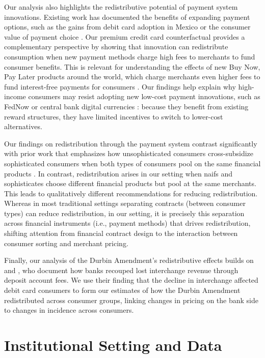 \documentclass[11pt,english]{article}
\theoremstyle{remark}
\begin{document}
Our analysis also highlights the redistributive potential of payment system innovations.
Existing work has documented the benefits of expanding payment options, such as the gains from debit card adoption in Mexico \citep{Higgins2024} or the consumer value of payment choice \citep{Alvarez.Argente2025}.
Our premium credit card counterfactual provides a complementary perspective by showing that innovation can redistribute consumption when new payment methods charge high fees to merchants to fund consumer benefits.
This is relevant for understanding the effects of new Buy Now, Pay Later products around the world, which charge merchants even higher fees to fund interest-free payments for consumers \citep{Berg.etal2024}.
Our findings help explain why high-income consumers may resist adopting new low-cost payment innovations, such as FedNow or central bank digital currencies \citep{whited2022will}: because they benefit from existing reward structures, they have limited incentives to switch to lower-cost alternatives.

Our findings on redistribution through the payment system contrast significantly with prior work that emphasizes how unsophisticated consumers cross-subsidize sophisticated consumers when both types of consumers pool on the same financial products \citep{Gabaix.Laibson2006, Fisher.etal2024, Agarwal.etal2022}.
In contrast, redistribution arises in our setting when naifs and sophisticates choose different financial products but pool at the same merchants.
This leads to qualitatively different recommendations for reducing redistribution.
Whereas in most traditional settings separating contracts (between consumer types) can reduce redistribution, in our setting, it is precisely this separation across financial instruments (i.e., payment methods) that drives redistribution, shifting attention from financial contract design to the interaction between consumer sorting and merchant pricing.

Finally, our analysis of the Durbin Amendment's redistributive effects builds on \citet{manuszak2017impact} and \citet{Mukharlyamov.Sarin2025}, who document how banks recouped lost interchange revenue through deposit account fees. We use their finding that the decline in interchange affected debit card consumers to form our estimates of how the Durbin Amendment redistributed across consumer groups, linking changes in pricing on the bank side to changes in incidence across consumers.



\section{Institutional Setting and Data\label{sec:institutional-data}}
\end{document}
